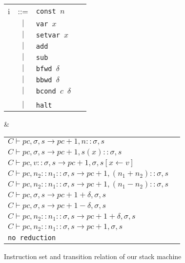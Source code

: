\documentclass{llncs}
\begin{document}
\begin{figure}
  \centering
  \begin{twolistings}
    \begin{tabular}{rcll}
i & ::=   & \texttt{const $n$                     }\\
  & $|$   & \texttt{var   $x$                              }\\
  & $|$   & \texttt{setvar  $x$                            }\\
  & $|$   & \texttt{add                                        }\\
  & $|$   & \texttt{sub                                        }\\
  & $|$   & \texttt{bfwd $\delta$             }\\
  & $|$   & \texttt{bbwd $\delta$              }\\
  & $|$   & \texttt{bcond $c$ $\delta$ }\\
 \\
  & $|$   & \texttt{halt                                       }\\
      \end{tabular}
& \qquad 
      \begin{tabular}{ll}
$C \vdash pc,\sigma,s \to pc+1, n :: \sigma,s$ & \text{if $C(pc)$ = \texttt{const $n$}} \\
$C \vdash pc,\sigma,s \to pc+1, s(x) :: \sigma,s$ & \text{if $C(pc)$ = \texttt{var $x$}} \\
$C \vdash pc,v::\sigma,s \to pc+1, \sigma,s[x \leftarrow v]$ & \text{if $C(pc)$ = \texttt{setvar $x$}} \\
$C \vdash pc,n_2::n_1::\sigma,s \to pc+1, (n_1+n_2)::\sigma,s$ & \text{if $C(pc)$ = \texttt{add}} \\
$C \vdash pc,n_2::n_1::\sigma,s \to pc+1, (n_1-n_2)::\sigma,s$ & \text{if $C(pc)$ = \texttt{sub}} \\
$C \vdash pc,\sigma,s \to pc+1+\delta, \sigma,s$ & \text{if $C(pc)$ = \texttt{bfwd $\delta$}} \\
$C \vdash pc,\sigma,s \to pc+1-\delta, \sigma,s$ & \text{if $C(pc)$ = \texttt{bbwd $\delta$}} \\
$C \vdash pc,n_2::n_1::\sigma,s \to pc+1+\delta, \sigma,s$ & \text{if $C(pc)$ = \texttt{bcond c $\delta$} and $c~n_1~n_2$} \\
$C \vdash pc,n_2::n_1::\sigma,s \to pc+1, \sigma,s$ & \text{if $C(pc)$
  = \texttt{bcond c $\delta$} and $\neg (c~n_1~n_2)$} \\
\texttt{no reduction}
      \end{tabular}
\end{twolistings}
  \caption{Instruction set and transition relation of our stack machine}
  \label{fig:stack}
\end{figure}
\end{document}
